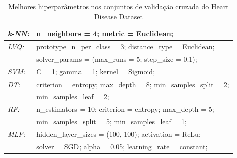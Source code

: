 \documentclass[journal]{IEEEtran}
\begin{document}
\begin{table}[h!]
	\caption{Melhores hiperparâmetros nos conjuntos de validação cruzada do Heart Disease Dataset}
	\label{tab:14}
	\begin{tabular}{ l l }
		\hline
		\textit{k-NN:} & n\_neighbors = 4; metric = Euclidean;                         \\
		\hline
		\textit{LVQ:}  & prototype\_n\_per\_class = 3; distance\_type = Euclidean;     \\  & solver\_params = (max\_runs = 5; step\_size = 0.1);\\
		\hline
		\textit{SVM:}  & C = 1; gamma = 1; kernel = Sigmoid;                           \\
		\hline
		\textit{DT:}   & criterion = entropy; max\_depth = 8; min\_samples\_split = 2; \\  & min\_samples\_leaf = 2;\\
		\hline
		\textit{RF:}   & n\_estimators = 10; criterion = entropy; max\_depth = 5;      \\  & min\_samples\_split = 5; min\_samples\_leaf = 1;\\
		\hline
		\textit{MLP:}  & hidden\_layer\_sizes = (100, 100); activation = ReLu;         \\  & solver = SGD; alpha = 0.05; learning\_rate = constant;\\
		\hline
	\end{tabular}
\end{table}
\end{document}
